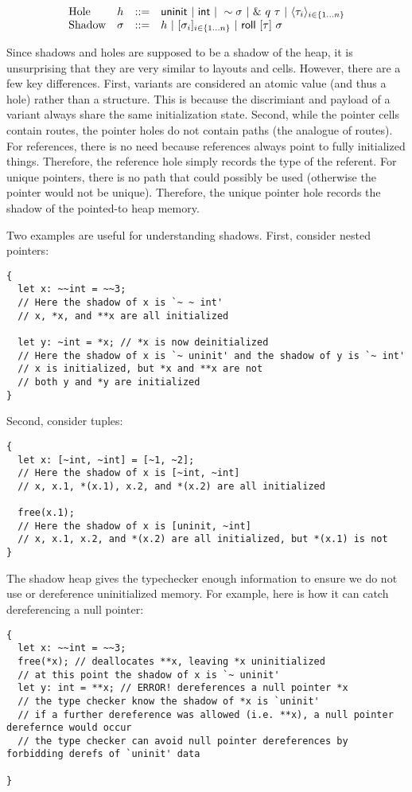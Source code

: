 \[
\begin{array}{lccl}
\textrm{Hole} & h & ::= & \mathsf{uninit} ~|~ \mathsf{int} ~|~ \sim{\sigma} 
				      ~|~ \&~{{q}~{\tau}} ~|~ \langle{{\tau}_{i}}\rangle_{{i} \in \{1 \ldots {n}\} } \\
\textrm{Shadow} & \sigma & ::= & h ~|~ [{{\sigma}_{i}}]_{{i} \in \{1 \ldots {n}\} } ~|~ \mathsf{roll}~[{\tau}]~{\sigma} \\
\end{array}
\]

Since shadows and holes are supposed to be a shadow of the heap,
it is unsurprising that they are very similar to layouts and cells.
However, there are a few key differences.
First, variants are considered an atomic value (and thus a hole) rather than
a structure. This is because the discrimiant and payload of a variant always
share the same initialization state.
Second, while the pointer cells contain routes, the pointer holes do not
contain paths (the analogue of routes).
For references, there is no need because references always point to fully initialized things.
Therefore, the reference hole simply records the type of the referent.
For unique pointers, there is no path that could possibly be used
(otherwise the pointer would not be unique).
Therefore, the unique pointer hole records the shadow of the pointed-to heap memory.

Two examples are useful for understanding shadows.
First, consider nested pointers:
\begin{verbatim}
{
  let x: ~~int = ~~3;
  // Here the shadow of x is `~ ~ int'
  // x, *x, and **x are all initialized

  let y: ~int = *x; // *x is now deinitialized
  // Here the shadow of x is `~ uninit' and the shadow of y is `~ int'
  // x is initialized, but *x and **x are not
  // both y and *y are initialized
}
\end{verbatim}

Second, consider tuples:
\begin{verbatim}
{
  let x: [~int, ~int] = [~1, ~2];
  // Here the shadow of x is [~int, ~int]
  // x, x.1, *(x.1), x.2, and *(x.2) are all initialized

  free(x.1);
  // Here the shadow of x is [uninit, ~int]
  // x, x.1, x.2, and *(x.2) are all initialized, but *(x.1) is not
}
\end{verbatim}

The shadow heap gives the typechecker enough information 
to ensure we do not use or dereference uninitialized memory.
For example, here is how it can catch dereferencing a null pointer:
\begin{verbatim}
{
  let x: ~~int = ~~3;
  free(*x); // deallocates **x, leaving *x uninitialized
  // at this point the shadow of x is `~ uninit'
  let y: int = **x; // ERROR! dereferences a null pointer *x
  // the type checker know the shadow of *x is `uninit'
  // if a further dereference was allowed (i.e. **x), a null pointer derefernce would occur
  // the type checker can avoid null pointer dereferences by forbidding derefs of `uninit' data

}
\end{verbatim}

